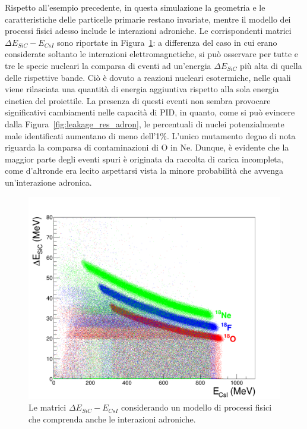 Rispetto all'esempio precedente, in questa simulazione la geometria e le caratteristiche delle particelle primarie restano invariate, mentre il modello dei processi fisici adesso include le interazioni adroniche. 
Le corrispondenti matrici $\Delta E_{SiC} - E_{CsI}$ sono riportate in Figura~\ref{fig:deltaE_ERes_adron}: a differenza del caso in cui erano considerate soltanto le interazioni elettromagnetiche, si può osservare per tutte e tre le specie nucleari la comparsa di eventi ad un'energia $\Delta E_{SiC}$ più alta di quella delle rispettive bande.
Ciò è dovuto a reazioni nucleari esotermiche, nelle quali viene rilasciata una quantità di energia aggiuntiva rispetto alla sola energia cinetica del proiettile.
La presenza di questi eventi non sembra provocare significativi cambiamenti nelle capacità di PID, in quanto, come si può evincere dalla Figura~\ref{fig:leakage_res_adron}, le percentuali di nuclei potenzialmente male identificati aumentano di meno dell'1\%.
L'unico mutamento degno di nota riguarda la comparsa di contaminazioni di O in Ne.
Dunque, è evidente che la maggior parte degli eventi spuri è originata da raccolta di carica incompleta, come d'altronde era lecito aspettarsi vista la minore probabilità che avvenga un'interazione adronica.


\begin{figure} [!p]
	\centering
	\includegraphics[width=\textwidth, keepaspectratio]{Grafici_Tesi/Interazioni_adroniche/deltaE_ERes.png}
	\caption{Le matrici $\Delta E_{SiC} - E_{CsI}$ considerando un modello di processi fisici che comprenda anche le interazioni adroniche.} \label{fig:deltaE_ERes_adron}
\end{figure}




